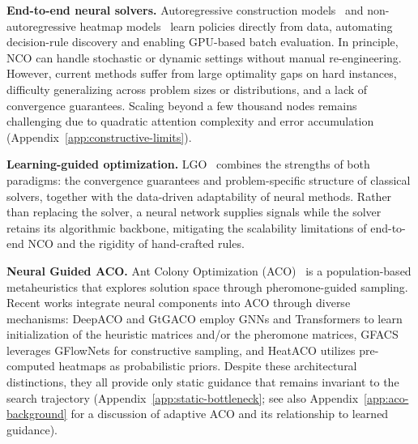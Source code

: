 \documentclass[sigconf,review]{acmart}
\newcommand{\DyNACO}{\textsc{DyNACO}}
\begin{document}
\smallskip\noindent\textbf{End-to-end neural solvers.}
Autoregressive construction models~\cite{pointernetwork,attentionmodel,pomo} and non-autoregressive heatmap models~\cite{bq,lehd,invit,sigd,l2c} learn policies directly from data, automating decision-rule discovery and enabling GPU-based batch evaluation.
In principle, NCO can handle stochastic or dynamic settings without manual re-engineering.
However, current methods suffer from large optimality gaps on hard instances, difficulty generalizing across problem sizes or distributions, and a lack of convergence guarantees.
Scaling beyond a few thousand nodes remains challenging due to quadratic attention complexity and error accumulation (Appendix~\ref{app:constructive-limits}).

\smallskip\noindent\textbf{Learning-guided optimization.}
LGO~\cite{learn2branch,learn2delegate, learn2optimize, 2optlearning, neuopt, neurolkh} combines the strengths of both paradigms: the convergence guarantees and problem-specific structure of classical solvers, together with the data-driven adaptability of neural methods.
Rather than replacing the solver, a neural network supplies signals while the solver retains its algorithmic backbone, mitigating the scalability limitations of end-to-end NCO and the rigidity of hand-crafted rules. 

\smallskip\noindent\textbf{Neural Guided ACO.}  Ant Colony Optimization (ACO)~\cite{ACO, maxmin} is a population-based metaheuristics that explores solution space through pheromone-guided sampling. Recent works integrate neural components into ACO through diverse mechanisms: DeepACO \cite{deepaco} and GtGACO \cite{gtgaco} employ GNNs and Transformers to learn initialization of the heuristic matrices and/or the pheromone matrices, GFACS \cite{gfacs} leverages GFlowNets for constructive sampling, and HeatACO \cite{heataco} utilizes pre-computed heatmaps as probabilistic priors. Despite these architectural distinctions, they all provide only static guidance that remains invariant to the search trajectory (Appendix~\ref{app:static-bottleneck}; see also Appendix~\ref{app:aco-background} for a discussion of adaptive ACO and its relationship to learned guidance).
\end{document}
